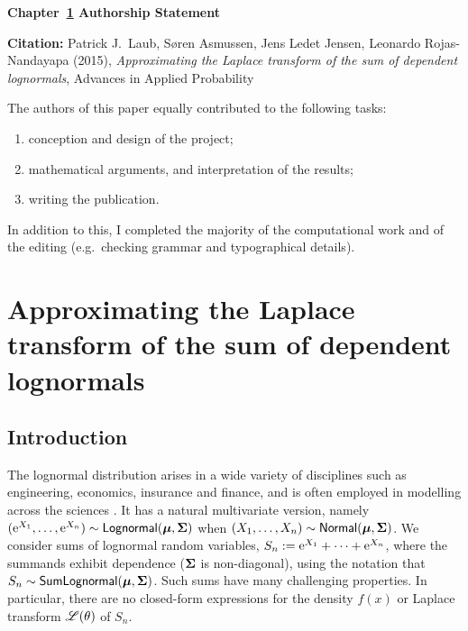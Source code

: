 \newpage

\vspace*{\fill}

{\large \bf Chapter~\ref{chp:Laplace} Authorship Statement}

\vspace{1em}

{\bf Citation:} Patrick J.\ Laub, S{\o}ren Asmussen, Jens Ledet Jensen, Leonardo Rojas-Nandayapa (2015), \emph{Approximating the Laplace transform of the sum of dependent lognormals}, Advances in Applied Probability

\vspace{1em}

The authors of this paper equally contributed to the following tasks:
\begin{enumerate}
\item conception and design of the project;
\item mathematical arguments, and interpretation of the results;
\item writing the publication.
\end{enumerate}

In addition to this, I completed the majority of the computational work and of the editing (e.g.\ checking grammar and typographical details).

\vspace{3em}

\vspace*{\fill}


\chapter{Approximating the Laplace transform of the sum of dependent lognormals} \label{chp:Laplace}

\section{Introduction}\label{S:Intro}

The lognormal distribution arises in a wide variety of disciplines such as
engineering, economics, insurance and finance, and is often employed in
modelling across the sciences
\cite{aitchison1957lognormal,crow1988lognormal,dufresne2008,
  johnson1994continuous,limpert2001log}. It
has a natural multivariate version, namely $(\mathrm{e}^{X_1}, \dots, \mathrm{e}^{X_n})
\sim \mathsf{Lognormal}(\bm{\mu}, \bm{\Sigma})$ when $(X_1, \dots, X_n) \sim \mathsf{Normal}(\bm{\mu},
\bm{\Sigma})$. We consider sums of lognormal random variables,
$S_n := \mathrm{e}^{X_1} + \cdots + \mathrm{e}^{X_n}$, where the summands exhibit
dependence ($\bm{\Sigma}$ is non-diagonal), using the notation that $S_n
\sim \mathsf{SumLognormal}(\bm{\mu}, \bm{\Sigma})$. Such sums have many challenging properties. In
particular, there are no closed-form expressions for the density $f(x)$ or
Laplace transform $\mathscr{L}(\theta)$ of $S_n$.

